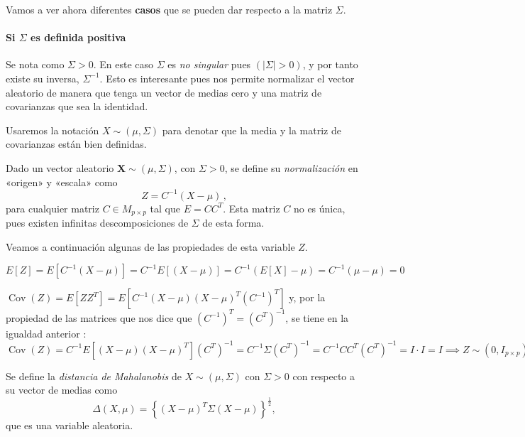 Vamos a ver ahora diferentes \textbf{casos} que se pueden dar respecto a la matriz $\Sigma$.

\paragraph{Si $\Sigma$ es definida positiva} Se nota como $\Sigma > 0$. En este caso $\Sigma$ es \emph{no singular} pues $(|\Sigma| > 0)$, y por tanto existe su inversa, $\Sigma^{-1}$. Esto es interesante pues nos permite normalizar el vector aleatorio de manera que tenga un vector de medias cero y una matriz de covarianzas que sea la identidad.

\begin{nota}
  Usaremos la notación $X\sim(\mu,\Sigma)$ para denotar que la media y la matriz de covarianzas están bien definidas.
\end{nota}

\begin{ndef}[Normalización]
    Dado un vector aleatorio $\boldsymbol X\sim(\mu,\Sigma)$, con $\Sigma>0$, se define su \emph{normalización} en «origen» y «escala» como
    \[
  Z = C^{-1}(X - \mu)\,,
\]
para cualquier matriz $C\in M_{p\times p}$ tal que $E = CC^T$. Esta matriz $C$ no es única, pues existen infinitas descomposiciones de $\Sigma$ de esta forma.

  \end{ndef}

Veamos a continuación algunas de las propiedades de esta variable $Z$.
  \begin{nlist}
    \item
  $
  E[Z] = E[C^{-1}(X-\mu)] = C^{-1}E[(X-\mu)] = C^{-1}(E[X] - \mu) = C^{-1}(\mu - \mu ) = 0
  $

\item $\operatorname{Cov}(Z) = E[ZZ ^T] = E[C^{-1}(X-\mu)(X-\mu)^T(C^{-1})^T]$ y, por la propiedad de las matrices que nos dice que $(C^{-1})^T = (C^T)^{-1}$, se tiene en la igualdad anterior : $\operatorname{Cov}(Z) = C^{-1}E[(X-\mu)(X-\mu)^T](C^T)^{-1} = C^{-1} \Sigma (C^T)^{-1} = C^{-1}CC^T(C^T)^{-1} = I \cdot I = I \implies Z \sim (0, I_{p\times p}).$

  \end{nlist}

  \begin{ndef}
    Se define la \emph{distancia de Mahalanobis} de $X\sim(\mu,\Sigma)$ con $\Sigma > 0$ con respecto a su vector de medias como
    \[
    \Delta(X,\mu) = \left\{ (X-\mu)^T \Sigma (X-\mu) \right\} ^{\frac{1}{2}},
    \]
    que es una variable aleatoria.
  \end{ndef}

